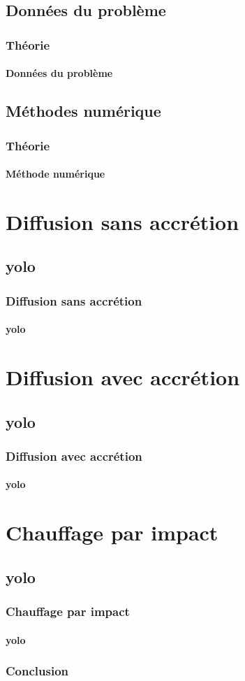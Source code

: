 \documentclass{beamer}
\begin{document}
\subsection{Données du problème}

\begin{frame}
	\frametitle{Théorie}
	\framesubtitle{Données du problème}
	
\end{frame}

\subsection{Méthodes numérique}

\begin{frame}
	\frametitle{Théorie}
	\framesubtitle{Méthode numérique}
	
\end{frame}

\section{Diffusion sans accrétion}
\subsection{yolo}

\begin{frame}
	\frametitle{Diffusion sans accrétion}
	\framesubtitle{yolo}
	
\end{frame}

\section{Diffusion avec accrétion}
\subsection{yolo}

\begin{frame}
	\frametitle{Diffusion avec accrétion}
	\framesubtitle{yolo}
	
\end{frame}

\section{Chauffage par impact}
\subsection{yolo}

\begin{frame}
	\frametitle{Chauffage par impact}
	\framesubtitle{yolo}
	
\end{frame}




\begin{frame}
\frametitle{Conclusion}
\framesubtitle{\ }

\end{frame}

\end{document}

